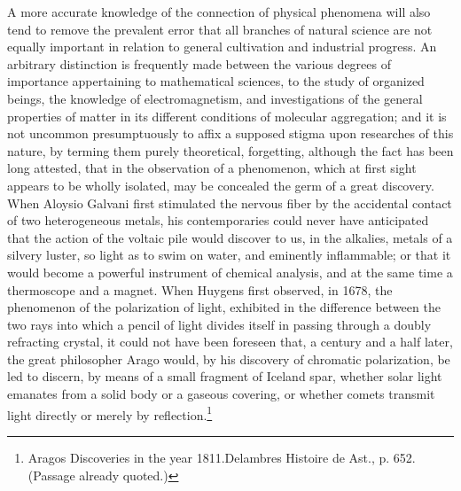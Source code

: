 A more accurate knowledge of the connection of physical phenomena will also tend to remove the prevalent error that all branches of natural science are not equally important in relation to general cultivation and industrial progress. An arbitrary distinction is frequently made between the various degrees of importance appertaining to mathematical sciences, to the study of organized beings, the knowledge of electromagnetism, and investigations of the general properties of matter in its different conditions of molecular aggregation; and it is not uncommon presumptuously to affix a supposed stigma upon researches of this nature, by terming them purely theoretical, forgetting, although the fact has been long attested, that in the observation of a phenomenon, which at first sight appears to be wholly isolated, may be concealed the germ of a great discovery. When Aloysio Galvani first stimulated the nervous fiber by the accidental contact of two heterogeneous metals, his contemporaries could never have anticipated that the action of the voltaic pile would discover to us, in the alkalies, metals of a silvery luster, so light as to swim on water, and eminently inflammable; or that it would become a powerful instrument of chemical analysis, and at the same time a thermoscope and a magnet. When Huygens first observed, in 1678, the phenomenon of the polarization of light, exhibited in the difference between the two rays into which a pencil of light divides itself in passing through a doubly refracting crystal, it could not have been foreseen that, a century and a half later, the great philosopher Arago would, by his discovery of chromatic polarization, be led to discern, by means of a small fragment of Iceland spar, whether solar light emanates from a solid body or a gaseous covering, or whether comets transmit light directly or merely by reflection.\footnote{Aragos Discoveries in the year 1811.Delambres Histoire de Ast., p. 652. (Passage already quoted.)}

